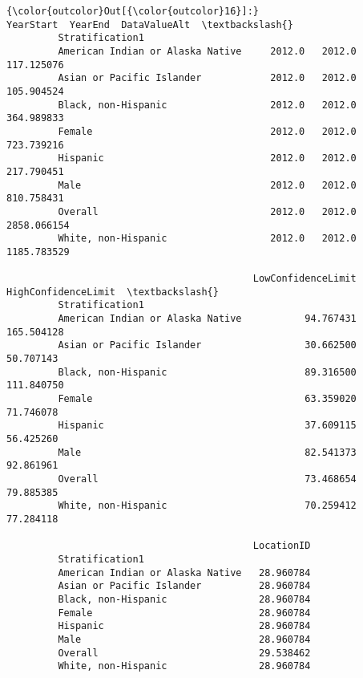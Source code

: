 \documentclass[11pt]{article}
\begin{document}
\begin{Verbatim}[commandchars=\\\{\}]
{\color{outcolor}Out[{\color{outcolor}16}]:}                                   YearStart  YearEnd  DataValueAlt  \textbackslash{}
         Stratification1                                                      
         American Indian or Alaska Native     2012.0   2012.0    117.125076   
         Asian or Pacific Islander            2012.0   2012.0    105.904524   
         Black, non-Hispanic                  2012.0   2012.0    364.989833   
         Female                               2012.0   2012.0    723.739216   
         Hispanic                             2012.0   2012.0    217.790451   
         Male                                 2012.0   2012.0    810.758431   
         Overall                              2012.0   2012.0   2858.066154   
         White, non-Hispanic                  2012.0   2012.0   1185.783529   
         
                                           LowConfidenceLimit  HighConfidenceLimit  \textbackslash{}
         Stratification1                                                             
         American Indian or Alaska Native           94.767431           165.504128   
         Asian or Pacific Islander                  30.662500            50.707143   
         Black, non-Hispanic                        89.316500           111.840750   
         Female                                     63.359020            71.746078   
         Hispanic                                   37.609115            56.425260   
         Male                                       82.541373            92.861961   
         Overall                                    73.468654            79.885385   
         White, non-Hispanic                        70.259412            77.284118   
         
                                           LocationID  
         Stratification1                               
         American Indian or Alaska Native   28.960784  
         Asian or Pacific Islander          28.960784  
         Black, non-Hispanic                28.960784  
         Female                             28.960784  
         Hispanic                           28.960784  
         Male                               28.960784  
         Overall                            29.538462  
         White, non-Hispanic                28.960784  
\end{Verbatim}
            
\end{document}
